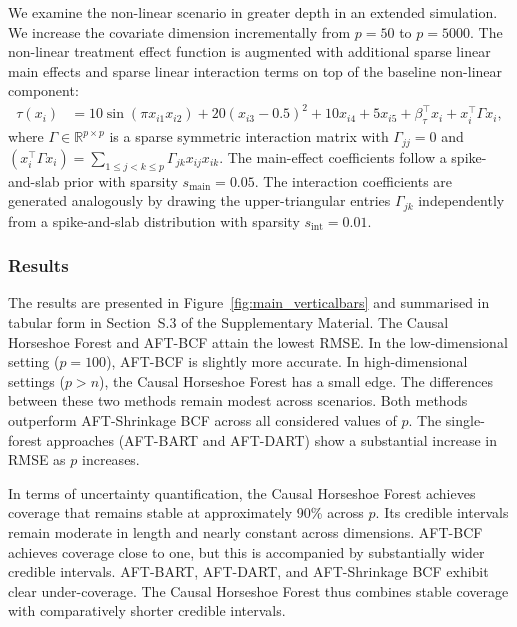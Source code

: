 We examine the non-linear scenario in greater depth in an extended simulation.
We increase the covariate dimension incrementally from $p = 50$ to $p = 5000$.
The non-linear treatment effect function is augmented with additional sparse linear main effects and sparse linear interaction terms on top of the baseline non-linear component:
\begin{equation}
\begin{split}
\tau(x_i) &=
10 \sin(\pi x_{i1} x_{i2})
+ 20 (x_{i3} - 0.5)^2
+ 10 x_{i4}
+ 5 x_{i5} + \beta_{\tau}^\top x_i
+ x_i^\top \Gamma x_i ,
\end{split}
\end{equation}
where $\Gamma \in \mathbb{R}^{p\times p}$ is a sparse symmetric interaction matrix with
$\Gamma_{jj}=0$ and $(x_i^\top \Gamma x_i)=\sum_{1\le j<k\le p}\Gamma_{jk}x_{ij}x_{ik}$.
The main-effect coefficients follow a spike-and-slab prior with sparsity $s_{\mathrm{main}}=0.05$.
The interaction coefficients are generated analogously by drawing the upper-triangular
entries $\Gamma_{jk}$ independently from a spike-and-slab distribution with sparsity
$s_{\mathrm{int}}=0.01$.


 

\subsubsection{Results}\label{sec:sim_results}

The results are presented in Figure~\ref{fig:main_verticalbars} and summarised in tabular form in Section~S.3 of the Supplementary Material. 
The Causal Horseshoe Forest and AFT-BCF attain the lowest RMSE. 
In the low-dimensional setting ($p = 100$), AFT-BCF is slightly more accurate. 
In high-dimensional settings ($p > n$), the Causal Horseshoe Forest has a small edge. 
The differences between these two methods remain modest across scenarios. 
Both methods outperform AFT-Shrinkage BCF across all considered values of $p$. 
The single-forest approaches (AFT-BART and AFT-DART) show a substantial increase in RMSE as $p$ increases.

In terms of uncertainty quantification, the Causal Horseshoe Forest achieves coverage that remains stable at approximately 90\% across $p$. 
Its credible intervals remain moderate in length and nearly constant across dimensions.
AFT-BCF achieves coverage close to one, but this is accompanied by substantially wider credible intervals. 
AFT-BART, AFT-DART, and AFT-Shrinkage BCF exhibit clear under-coverage.
The Causal Horseshoe Forest thus combines stable coverage with comparatively shorter credible intervals.


